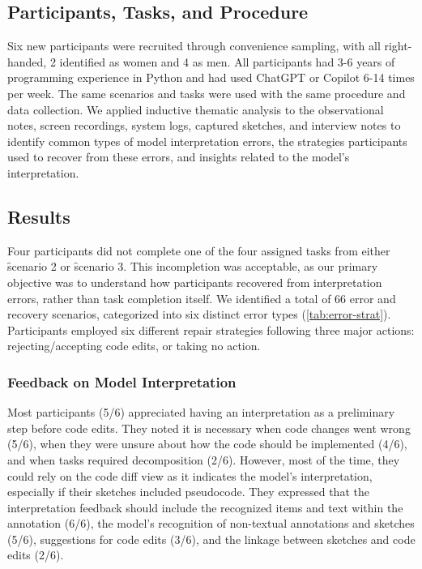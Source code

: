 \subsection{Participants, Tasks, and Procedure}
Six new participants were recruited through convenience sampling, with all right-handed, 2 identified as women and 4 as men. All participants had 3-6 years of programming experience in Python and had used ChatGPT or Copilot 6-14 times per week. The same scenarios and tasks were used with the same procedure and data collection. 
We applied inductive thematic analysis to the observational notes, screen recordings, system logs, captured sketches, and interview notes to identify common types of model interpretation errors, the strategies participants used to recover from these errors, and insights related to the model’s interpretation.



\subsection{Results}
Four participants did not complete one of the four assigned tasks from either \f{scenario 2} or \f{scenario 3}. This incompletion was acceptable, as our primary objective was to understand how participants recovered from interpretation errors, rather than task completion itself. We identified a total of 66 error and recovery scenarios, categorized into six distinct error types (\autoref{tab:error-strat}). Participants employed six different repair strategies following three major actions: rejecting/accepting code edits, or taking no action.

\subsubsection{Feedback on Model Interpretation}
Most participants (5/6) appreciated having an interpretation as a preliminary step before code edits. They noted it is necessary when code changes went wrong (5/6), when they were unsure about how the code should be implemented (4/6), and when tasks required decomposition (2/6). However, most of the time, they could rely on the code diff view as it indicates the model's interpretation, especially if their sketches included pseudocode. They expressed that the interpretation feedback should include the recognized items and text within the annotation (6/6), the model's recognition of non-textual annotations and sketches (5/6), suggestions for code edits (3/6), and the linkage between sketches and code edits (2/6).



